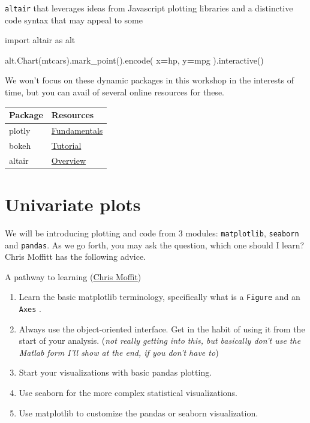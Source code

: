 \documentclass[
  letterpaper,
]{scrbook}
\newenvironment{Shaded}{\begin{snugshade}}{\end{snugshade}}
\newcommand{\ImportTok}[1]{#1}
\newcommand{\NormalTok}[1]{#1}
\newcommand{\OperatorTok}[1]{\textcolor[rgb]{0.81,0.36,0.00}{\textbf{#1}}}
\newcommand{\StringTok}[1]{\textcolor[rgb]{0.31,0.60,0.02}{#1}}
\providecommand{\tightlist}{%
  \setlength{\itemsep}{0pt}\setlength{\parskip}{0pt}}
\begin{document}
\texttt{altair} that leverages ideas from Javascript plotting libraries and a distinctive code syntax that may appeal to some

\begin{Shaded}
\begin{Highlighting}[]
\ImportTok{import}\NormalTok{ altair }\ImportTok{as}\NormalTok{ alt}

\NormalTok{alt.Chart(mtcars).mark\_point().encode(}
\NormalTok{    x}\OperatorTok{=}\StringTok{\textquotesingle{}hp\textquotesingle{}}\NormalTok{,}
\NormalTok{    y}\OperatorTok{=}\StringTok{\textquotesingle{}mpg\textquotesingle{}}
\NormalTok{).interactive()}
\end{Highlighting}
\end{Shaded}

We won't focus on these dynamic packages in this workshop in the interests of time, but you can avail of several online resources for these.

\begin{longtable}[]{@{}ll@{}}
\toprule
Package & Resources\tabularnewline
\midrule
\endhead
plotly & \href{https://plotly.com/python/}{Fundamentals}\tabularnewline
bokeh & \href{https://mybinder.org/v2/gh/bokeh/bokeh-notebooks/master?filepath=tutorial\%2F00\%20-\%20Introduction\%20and\%20Setup.ipynb}{Tutorial}\tabularnewline
altair & \href{https://altair-viz.github.io/getting_started/overview.html}{Overview}\tabularnewline
\bottomrule
\end{longtable}

\hypertarget{univariate-plots}{%
\section{Univariate plots}\label{univariate-plots}}

We will be introducing plotting and code from 3 modules: \texttt{matplotlib}, \texttt{seaborn} and \texttt{pandas}. As we go forth, you may ask the question, which one should I learn? Chris Moffitt has the following advice.

A pathway to learning (\href{https://pbpython.com/effective-matplotlib.html}{Chris Moffit})

\begin{enumerate}
\def\labelenumi{\arabic{enumi}.}
\tightlist
\item
  Learn the basic matplotlib terminology, specifically what is a \texttt{Figure} and an \texttt{Axes} .
\item
  Always use the object-oriented interface. Get in the habit of using it from the start of your analysis. (\emph{not really getting into this, but basically don't use the Matlab form I'll show at the end, if you don't have to})
\item
  Start your visualizations with basic pandas plotting.
\item
  Use seaborn for the more complex statistical visualizations.
\item
  Use matplotlib to customize the pandas or seaborn visualization.
\end{enumerate}
\end{document}
